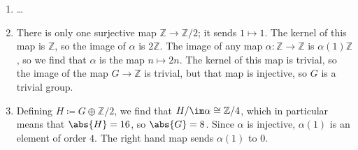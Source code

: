 \begin{enumerate}[label=(\alph*)]
	\item \ldots
	\item There is only one surjective map $\mathbb{Z}\to \mathbb{Z}/2$; it
		sends $1\mapsto 1$. The kernel of this map is $\mathbb{Z}$, so the image
		of $\alpha$ is $2\mathbb{Z}$. The image of any map $\alpha\colon \mathbb{Z}\to \mathbb{Z}$
		is $\alpha(1)\mathbb{Z}$, so we find that $\alpha$ is the map $n \mapsto 2n$.
		The kernel of this map is trivial, so the image of the map
		$G \to \mathbb{Z}$ is trivial, but that map is injective, so $G$ is
		a trivial group.
	\item Defining $H\coloneqq G\oplus \mathbb{Z}/2$, we find that
		$H/\im\alpha \cong \mathbb{Z}/4$, which in particular means that
		$\abs{H}=16$, so $\abs{G} = 8$. Since $\alpha$ is injective,
		$\alpha(1)$ is an element of order $4$. The right hand map sends
		$\alpha(1)$ to $0$.
\end{enumerate}
